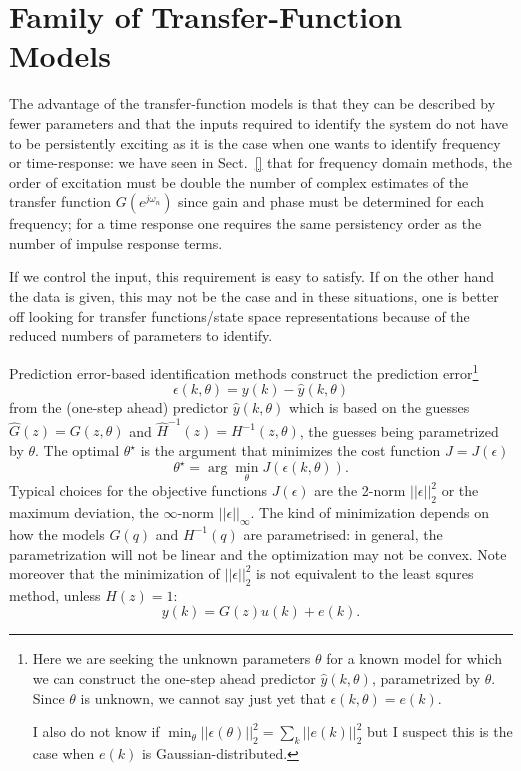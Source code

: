 \section{Family of Transfer-Function Models}
\label{sec:family-tf-models}

The advantage of the transfer-function models is that they can be described by fewer parameters and that the inputs required to identify the system do not have to be persistently exciting as it is the case when one wants to identify frequency or time-response: we have seen in Sect.~\ref{} that for frequency domain methods, the order of excitation must be double the number of complex estimates of the transfer function $G(e^{j\omega_n})$ since gain and phase must be determined for each frequency; for a time response one requires the same persistency order as the number of impulse response terms.

If we control the input, this requirement is easy to satisfy. If on the other hand the data is given, this may not be the case and in these situations, one is better off looking for transfer functions/state space representations because of the reduced numbers of parameters to identify.

Prediction error-based identification methods construct the prediction error\footnote{Here we are seeking the unknown parameters $\theta$ for a known model for which we can construct the one-step ahead predictor $\hat{y}(k,\theta)$, parametrized by $\theta$. Since $\theta$ is unknown, we cannot say just yet that $\epsilon(k,\theta) = e(k)$.

  I also do not know if $\min_\theta ||\epsilon(\theta)||_2^2 = \sum_k ||e(k)||_2^2$ but I suspect this is the case when $e(k)$ is Gaussian-distributed.}
\begin{equation}
  \label{eq:prediction-error-parametrized}
  \epsilon(k,\theta) = y(k) - \hat{y}(k,\theta)
\end{equation}
from the (one-step ahead) predictor $\hat{y}(k,\theta)$ which is based on the guesses $\hat{G}(z)=G(z,\theta)$ and $\hat{H}^{-1}(z)=H^{-1}(z,\theta)$, the guesses being parametrized by $\theta$. The optimal $\theta^\star$ is the argument that minimizes the cost function $J=J(\epsilon)$
\begin{equation*}
  \theta^\star = \arg \min_\theta J(\epsilon(k,\theta)).
\end{equation*}
Typical choices for the objective functions $J(\epsilon)$ are the 2-norm $||\epsilon||_2^2$ or the maximum deviation, the $\infty$-norm $||\epsilon||_\infty$. The kind of minimization depends on how the models $G(q)$ and $H^{-1}(q)$ are parametrised: in general, the parametrization will not be linear and the optimization may not be convex. Note moreover that the minimization of $||\epsilon||_2^2$ is not equivalent to the least squres method, unless  $H(z)=1$:
\begin{equation*}
  y(k) = G(z)u(k) + e(k).
\end{equation*}

